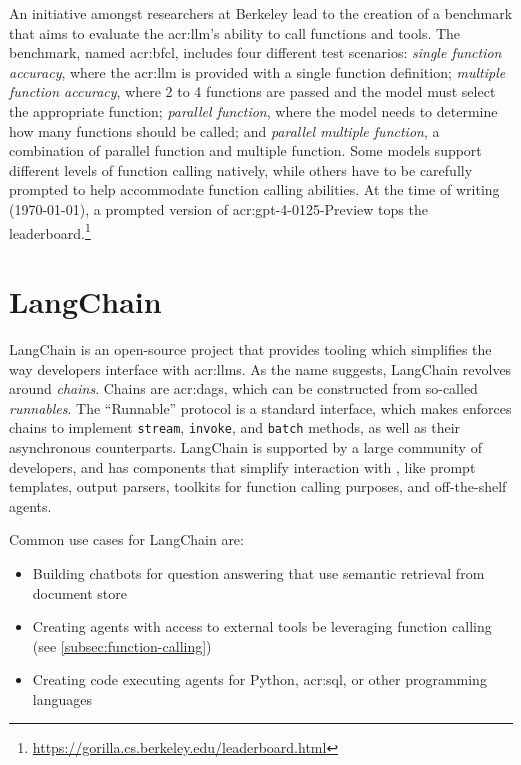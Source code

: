 An initiative amongst researchers at Berkeley \citep{yanfanjiaBerkeleyFunctionCalling2024} lead to the creation of a benchmark that aims to evaluate the \acrshort{acr:llm}'s ability to call functions and tools. The benchmark, named \gls{acr:bfcl}, includes four different test scenarios: \textit{single function accuracy}, where the \acrshort{acr:llm} is provided with a single function definition; \textit{multiple function accuracy}, where 2 to 4 functions are passed and the model must select the appropriate function; \textit{parallel function}, where the model needs to determine how many functions should be called; and \textit{parallel multiple function}, a combination of parallel function and multiple function. Some models support different levels of function calling natively, while others have to be carefully prompted to help accommodate function calling abilities. At the time of writing (\today), a prompted version of \acrshort{acr:gpt}-4-0125-Preview tops the leaderboard.\footnote{\url{https://gorilla.cs.berkeley.edu/leaderboard.html}}

\section{LangChain}
\label{sec:langchain}

LangChain \citep{langchainaiLangchainaiLangchain2022} is an open-source project that provides tooling which simplifies the way developers interface with \glspl{acr:llm}. As the name suggests, LangChain revolves around \textit{chains}. Chains are \glspl{acr:dag}, which can be constructed from so-called \textit{runnables}. The \enquote{Runnable} protocol is a standard interface, which makes enforces chains to implement \texttt{stream}, \texttt{invoke}, and \texttt{batch} methods, as well as their asynchronous counterparts. LangChain is supported by a large community of developers, and has components that simplify interaction with , like prompt templates, output parsers, toolkits for function calling purposes, and off-the-shelf agents.

Common use cases for LangChain are:

\begin{itemize}
    \item Building chatbots for question answering that use semantic retrieval from document store
    \item Creating agents with access to external tools be leveraging function calling (see \autoref{subsec:function-calling})
    \item Creating code executing agents for Python, \acrshort{acr:sql}, or other programming languages
\end{itemize}

